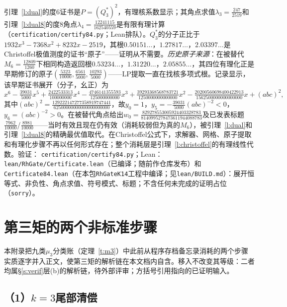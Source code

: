 \documentclass[11pt]{article}
\numberwithin{equation}{section}
\theoremstyle{definition}
\theoremstyle{remark}
\begin{document}
引理~\ref{l:dual}的度$6$证书是$P=(Q_3^*)^2$，有理核系数显示；其角点求值$\lambda_3=\tfrac{247}{2519}$和引理~\ref{l:dual8}的度$8$角点$\lambda_4=\tfrac{12241115}{162540559}$是有限有理计算（\texttt{certification/certify84.py}；Lean排队）。$Q_3^*$的分子正比于
$1932x^3-7368x^2+8232x-2519$，其根$0.50151\ldots$，$1.27817\ldots$，$2.03397\ldots$是Christoffel极值测度的证书“原子”——证明从不需要。\emph{历史原子来源}：在被替代$M_6=\tfrac{12809}{1260}$下相同构造返回根$0.53234\ldots$，$1.31220\ldots$，$2.05855\ldots$，其四位有理化正是早期修订的原子$(\tfrac{5323}{10000},\tfrac{6561}{5000},\tfrac{10293}{5000})$——LP提取一直在找核多项式根。记录显示，该早期证书展开（分子，幺正）为
\[
x^6-\tfrac{39031}{5000}x^5+\tfrac{2422533313}{100000000}x^4
-\tfrac{4746141355593}{125000000000}x^3
+\tfrac{39293368568783721}{1250000000000000}x^2
-\tfrac{20200560698400422913}{1562500000000000000}x
+(abc)^2,
\]
其中$(abc)^2=\tfrac{129222147277358919747441}{62500000000000000000000}$，故$y_0=1$，$y_5=-\tfrac{39031}{5000}(abc)^{-2}<0$，$y_6=(abc)^{-2}>0$。在被替代角点给出$w_0=\tfrac{829278553005924403328783}{8140995278473611944088783}$及已发表标题$\tfrac{7962}{10000}$/$\tfrac{8981}{10000}$——当时有效且现在仍有效（消耗较弱但为真的$M_6$），被引理~\ref{l:dual}和引理~\ref{l:dual8}的精确最优值取代。在Christoffel公式下，求解器、网格、原子提取和有理化步骤不再以任何形式存在；整个消耗层是引理~\ref{l:christoffel}的有理线性代数。验证：
\texttt{certification/certify84.py}；Lean：
\texttt{lean/RhGate/Certificate.lean}（已编译；随前作仓库发布）和\texttt{Certificate84.lean}（在本包\texttt{RhGateK14}工程中编译；见\texttt{lean/BUILD.md}）：展开恒等式、非负性、角点求值、符号模式、标题；不含任何未完成的证明占位（\texttt{sorry}）。


\section{第三矩的两个非标准步骤}\label{a:v1}

本附录把九类$\mu_3$分类账（定理~\ref{t:m3}）中此前从程序存档备忘录消耗的两个步骤实质逐字并入正文，使第三矩的解析链在本文档内自含。移入不改变其等级：二者均属\S\ref{s:verif}层(b)的解析链，待外部评审；方括号引用指向\cite{C26}的已证明输入。

\subsection*{（1）$k=3$尾部清偿}
\end{document}
